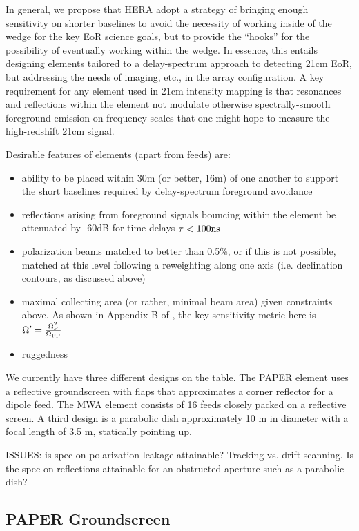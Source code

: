 \documentclass[11pt]{article}
\begin{document}
In general, we propose that HERA adopt a strategy of bringing enough sensitivity on shorter
baselines to avoid the necessity of working inside of the wedge for the key
EoR science goals, but to provide the ``hooks'' for the possibility of
eventually working within the wedge.  In essence, this entails designing
elements tailored to a delay-spectrum approach to detecting 21cm EoR, but
addressing the needs of imaging, etc., in the array configuration.
A key requirement for any element used in 21cm intensity mapping is that resonances and reflections
within the element not modulate otherwise spectrally-smooth foreground emission on frequency scales
that one might hope to measure the high-redshift 21cm signal.

Desirable features of elements (apart from feeds) are:
\begin{itemize}
\item ability to be placed within 30m (or better, 16m) of one another to support the
short baselines required by delay-spectrum foreground avoidance
\item reflections arising from foreground signals bouncing within the element
be attenuated by -60dB for time delays $\tau<100 {\rm ns}$
\item polarization beams matched to better than 0.5\%, or if this is not possible, matched
at this level following a reweighting along one axis (i.e. declination contours, as discussed above)
\item maximal collecting area (or rather, minimal beam area) given constraints above.  As shown
in Appendix B of \citet{parsons_et_al2013}, the key sensitivity metric here is 
$\Omega^\prime=\frac{\Omega_{\rm P}^2}{\Omega_{\rm PP}}$
\item ruggedness
\end{itemize}

We currently have three different designs on the table.  The PAPER element uses a reflective groundscreen
with flaps that approximates a corner reflector for a dipole feed.  The MWA element consists of 16
feeds closely packed on a reflective screen.  A third design is a parabolic dish approximately
10 m in diameter with a focal length of 3.5 m, statically pointing up.

ISSUES: is spec on polarization leakage attainable?  Tracking vs. drift-scanning.  Is the spec
on reflections attainable for an obstructed aperture such as a parabolic dish?

\subsection{PAPER Groundscreen}
\end{document}
